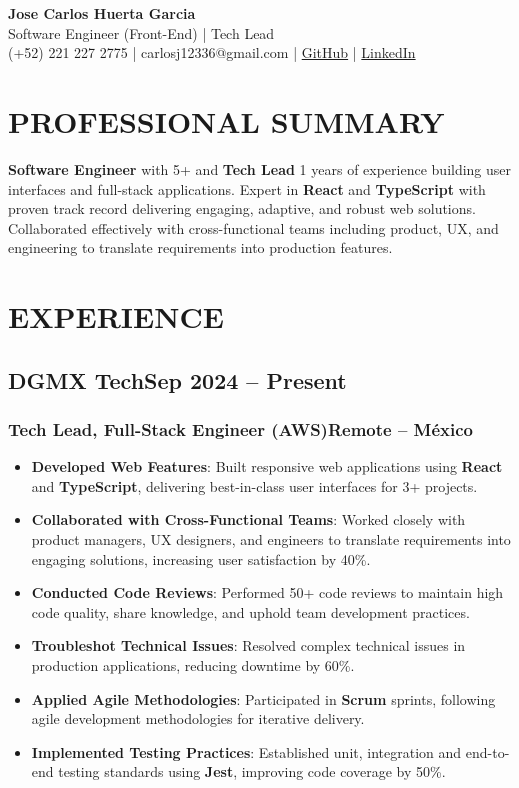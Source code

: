 \documentclass[a4paper,10pt]{article}
\newcommand{\kw}[1]{\textbf{\textcolor{keyword}{#1}}}
\newcommand{\tech}[1]{\textbf{\textcolor{tech}{#1}}}
\begin{document}
\begin{center}
{\bfseries\LARGE Jose Carlos Huerta Garcia} \\
Software Engineer (Front-End) | Tech Lead \\
(+52) 221 227 2775 | carlosj12336@gmail.com | \href{https://github.com/jcarloshg}{GitHub} | \href{https://www.linkedin.com/in/jose-carlos-huerta-garcia-773952212}{LinkedIn}
\end{center}

\section*{PROFESSIONAL SUMMARY}
\kw{Software Engineer} with 5+ and \kw{Tech Lead} 1 years of experience building user interfaces and full-stack applications. Expert in \kw{React} and \kw{TypeScript} with proven track record delivering engaging, adaptive, and robust web solutions. Collaborated effectively with cross-functional teams including product, UX, and engineering to translate requirements into production features.

\section*{EXPERIENCE}

\subsection*{DGMX Tech\hfill\textbf{Sep 2024 -- Present}}
\subsubsection*{Tech Lead, Full-Stack Engineer (AWS)\hfill Remote -- México}
\begin{itemize}[noitemsep, leftmargin=*]
    \item \textbf{Developed Web Features}: Built responsive web applications using \tech{React} and \tech{TypeScript}, delivering best-in-class user interfaces for 3+ projects.
    \item \textbf{Collaborated with Cross-Functional Teams}: Worked closely with product managers, UX designers, and engineers to translate requirements into engaging solutions, increasing user satisfaction by 40\%.
    \item \textbf{Conducted Code Reviews}: Performed 50+ code reviews to maintain high code quality, share knowledge, and uphold team development practices.
    \item \textbf{Troubleshot Technical Issues}: Resolved complex technical issues in production applications, reducing downtime by 60\%.
    \item \textbf{Applied Agile Methodologies}: Participated in \kw{Scrum} sprints, following agile development methodologies for iterative delivery.
    \item \textbf{Implemented Testing Practices}: Established unit, integration and end-to-end testing standards using \tech{Jest}, improving code coverage by 50\%.
\end{itemize}
\end{document}
